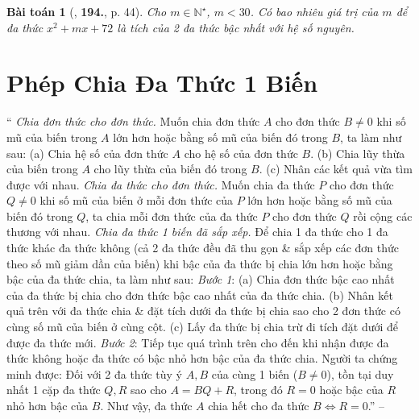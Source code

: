 \documentclass{article}
\numberwithin{equation}{section}
\newtheorem{baitoan}{Bài toán}
\begin{document}
\begin{baitoan}[\cite{Tuyen_Toan_7}, \textbf{194.}, p. 44]
	Cho $m\in\mathbb{N}^\star$, $m < 30$. Có bao nhiêu giá trị của $m$ để đa thức $x^2 + mx + 72$ là tích của 2 đa thức bậc nhất với hệ số nguyên.
\end{baitoan}


\section{Phép Chia Đa Thức 1 Biến}
`` \textit{Chia đơn thức cho đơn thức.} Muốn chia đơn thức $A$ cho đơn thức $B\ne0$ khi số mũ của biến trong $A$ lớn hơn hoặc bằng số mũ của biến đó trong $B$, ta làm như sau: (a) Chia hệ số của đơn thức $A$ cho hệ số của đơn thức $B$. (b) Chia lũy thừa của biến trong $A$ cho lũy thừa của biến đó trong $B$. (c) Nhân các kết quả vừa tìm được với nhau.  \textit{Chia đa thức cho đơn thức.} Muốn chia đa thức $P$ cho đơn thức $Q\ne0$ khi số mũ của biến ở mỗi đơn thức của $P$ lớn hơn hoặc bằng số mũ của biến đó trong $Q$, ta chia mỗi đơn thức của đa thức $P$ cho đơn thức $Q$ rồi cộng các thương với nhau.  \textit{Chia đa thức 1 biến đã sắp xếp.} Để chia 1 đa thức cho 1 đa thức khác đa thức không (cả 2 đa thức đều đã thu gọn \& sắp xếp các đơn thức theo số mũ giảm dần của biến) khi bậc của đa thức bị chia lớn hơn hoặc bằng bậc của đa thức chia, ta làm như sau: \textit{Bước 1}: (a) Chia đơn thức bậc cao nhất của đa thức bị chia cho đơn thức bậc cao nhất của đa thức chia. (b) Nhân kết quả trên với đa thức chia \& đặt tích dưới đa thức bị chia sao cho 2 đơn thức có cùng số mũ của biến ở cùng cột. (c) Lấy đa thức bị chia trừ đi tích đặt dưới để được đa thức mới. \textit{Bước 2}: Tiếp tục quá trình trên cho đến khi nhận được đa thức không hoặc đa thức có bậc nhỏ hơn bậc của đa thức chia.  Người ta chứng minh được: Đối với 2 đa thức tùy ý $A,B$ của cùng 1 biến ($B\ne0$), tồn tại duy nhất 1 cặp đa thức $Q,R$ sao cho $A = BQ + R$, trong đó $R = 0$ hoặc bậc của $R$ nhỏ hơn bậc của $B$. Như vậy, đa thức $A$ chia hết cho đa thức $B\Leftrightarrow R = 0$.'' -- \cite[Chap. VI, \S5, pp. 51--52]{SBT_Toan_7_Canh_Dieu_tap_2}
\end{document}
